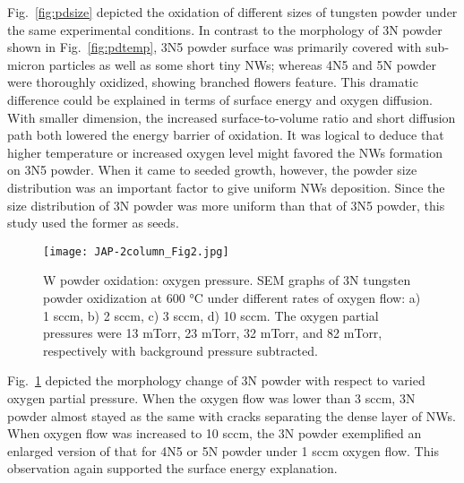 Fig.~\ref{fig:pdsize} depicted the oxidation of different sizes of tungsten powder under the same experimental conditions. In contrast to the morphology of 3N powder shown in Fig.~\ref{fig:pdtemp}, 3N5 powder surface was primarily covered with sub-micron particles as well as some short tiny NWs; whereas 4N5 and 5N powder were thoroughly oxidized, showing branched flowers feature. This dramatic difference could be explained in terms of surface energy and oxygen diffusion. With smaller dimension, the increased surface-to-volume ratio and short diffusion path both lowered the energy barrier of oxidation.\cite{tungsten1999} It was logical to deduce that higher temperature or increased oxygen level might favored the NWs formation on 3N5 powder. When it came to seeded growth, however, the powder size distribution was an important factor to give uniform NWs deposition. Since the size distribution of 3N powder was more uniform than that of 3N5 powder, this study used the former as seeds.
\begin{figure}[htb]
\centering
\texttt{[image: JAP-2column\_Fig2.jpg]}
\caption[W powder oxidation: oxygen pressure]{W powder oxidation: oxygen pressure. SEM graphs of 3N tungsten powder oxidization at 600 \si{\degreeCelsius} under different rates of oxygen flow: a) 1 sccm, b) 2 sccm, c) 3 sccm, d) 10 sccm. The oxygen partial pressures were 13 mTorr, 23 mTorr, 32 mTorr, and 82 mTorr, respectively with background pressure subtracted.}
\label{fig:pdoxy}
\end{figure}

Fig.~\ref{fig:pdoxy} depicted the morphology change of 3N powder with respect to varied oxygen partial pressure. When the oxygen flow was lower than 3 sccm, 3N powder almost stayed as the same with cracks separating the dense layer of NWs. When oxygen flow was increased to 10 sccm, the 3N powder exemplified an enlarged version of that for 4N5 or 5N powder under 1 sccm oxygen flow. This observation again supported the surface energy explanation.

